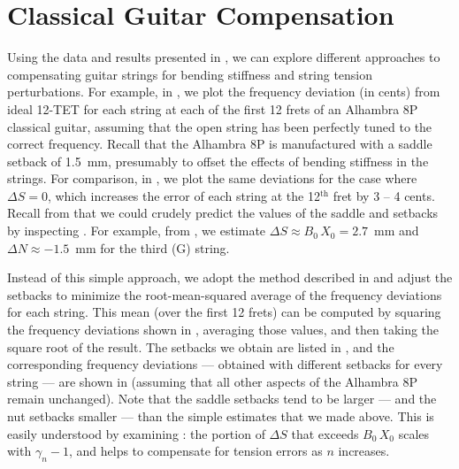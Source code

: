 %
%
%

 \section{Classical Guitar Compensation\label{sct:comp}}

Using the data and results presented in , we can explore different approaches to compensating guitar strings for bending stiffness and string tension perturbations. For example, in , we plot the frequency deviation (in cents) from ideal 12-TET for each string at each of the first 12 frets of an Alhambra 8P classical guitar, assuming that the open string has been perfectly tuned to the correct frequency. Recall that the Alhambra 8P is manufactured with a saddle setback of 1.5~mm, presumably to offset the effects of bending stiffness in the strings. For comparison, in , we plot the same deviations for the case where $\Delta S = 0$, which increases the error of each string at the 12$^\text{th}$ fret by 3 -- 4 cents. Recall from  that we could crudely predict the values of the saddle and setbacks by inspecting . For example, from , we estimate $\Delta S \approx B_0\, X_0 = 2.7$~mm and $\Delta N \approx -1.5$~mm for the third (G) string.

Instead of this simple approach, we adopt the method described in  and adjust the setbacks to minimize the root-mean-squared average of the frequency deviations for each string. This mean (over the first 12 frets) can be computed by squaring the frequency deviations shown in , averaging those values, and then taking the square root of the result. The setbacks we obtain are listed in , and the corresponding frequency deviations --- obtained with different setbacks for every string --- are shown in  (assuming that all other aspects of the Alhambra 8P remain unchanged). Note that the saddle setbacks tend to be larger --- and the nut setbacks smaller --- than the simple estimates that we made above. This is easily understood by examining : the portion of $\Delta S$ that exceeds $B_0\, X_0$ scales with $\gamma_n - 1$, and helps to compensate for tension errors as $n$ increases.

